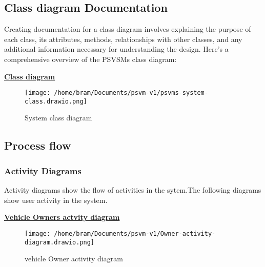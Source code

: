 \documentclass[a4paper, 12pt]{report}
\begin{document}
\subsection{Class diagram Documentation}
\noindent Creating documentation for a class diagram involves explaining the purpose of each class, its attributes, methods, relationships with other classes, and any additional information necessary for understanding the design. Here's a comprehensive overview of the PSVSMs  class diagram:
\par
\textbf{\underline{Class diagram}}
\begin{figure}[h] %
  \centering
  \texttt{[image: /home/bram/Documents/psvm-v1/psvms-system-class.drawio.png]} %
  \caption{System class diagram} %
  \label{fig:Class diagram} %
\end{figure}
\clearpage
\subsection{Process flow}
\subsubsection{Activity Diagrams}
\noindent Activity diagrams show the flow of activities in the sytem.The following diagrams show user activity in the system.\par
\textbf{\underline{Vehicle Owners actvity diagram}}\par
\begin{figure}[h] %
  \centering
  \texttt{[image: /home/bram/Documents/psvm-v1/Owner-activity-diagram.drawio.png]} %
  \caption{vehicle Owner activity diagram} %
  \label{fig:owners activity diagram} %
\end{figure}
\clearpage
\end{document}
